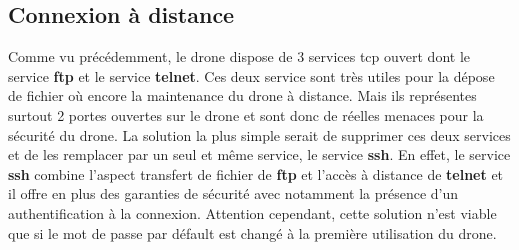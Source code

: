 \subsection{Connexion à distance}
Comme vu précédemment, le drone dispose de 3 services tcp ouvert dont le service \textbf{ftp} et le service \textbf{telnet}. Ces deux service sont très utiles pour la dépose de fichier où encore la maintenance du drone à distance. Mais ils représentes surtout 2 portes ouvertes sur le drone et sont donc de réelles menaces pour la sécurité du drone.
La solution la plus simple serait de supprimer ces deux services et de les remplacer par un seul et même service, le service \textbf{ssh}. En effet, le service \textbf{ssh} combine l'aspect transfert de fichier de \textbf{ftp} et l'accès à distance de \textbf{telnet} et il offre en plus des garanties de sécurité avec notamment la présence d'un authentification à la connexion. Attention cependant, cette solution n'est viable que si le mot de passe par défault est changé à la première utilisation du drone. 